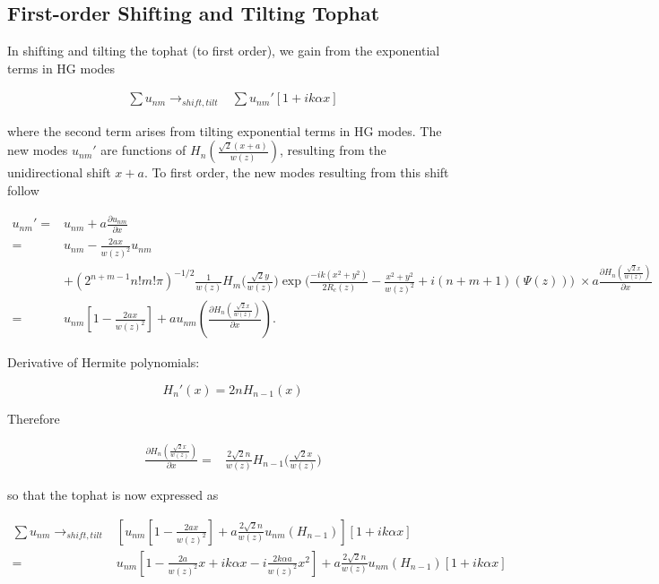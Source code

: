 \documentclass[aps,twoside,secnumarabic,balancelastpage,amsmath,amssymb,nofootinbib,hyperref=pdftex]{revtex4}
\begin{document}
\clearpage

\subsection{First-order Shifting and Tilting Tophat}

In shifting and tilting the tophat (to first order), we gain from the exponential terms in HG modes

\begin{align*}
\sum u_{nm} \rightarrow_{shift,tilt} &
    \sum u_{nm}' \left[
        1+ i k \alpha x
    \right]
\end{align*}


where the second term arises from tilting exponential terms in HG modes. The new modes $u_{nm}'$ are functions of $H_n(\frac{\sqrt{2}(x+a)}{w(z)})$, resulting from the unidirectional shift $x+a$. To first order, the new modes resulting from this shift follow

\begin{align*}
	u_{nm}' =& u_{nm} + a \frac{\partial u_{nm}}{\partial x}
	\\=&
		u_{nm} 
		-
		\frac{2ax}{w(z)^2} 
		u_{nm}
		\\&+
		(2^{n+m-1}n!m!\pi)^{-1/2}
		\frac{1}{w(z)}
		H_{m} \Big(\frac{\sqrt{2}y}{w(z)} \Big)
		\exp \Big(\frac{-ik(x^{2}+y^{2})}{2R_{c}(z)}-
		\frac{x^{2}+y^{2}}{w(z)^{2}} 
		+i(n+m+1)(\Psi(z))		
		\Big)\;
		\times
		a 		
		\frac{\partial H_n(\frac{\sqrt{2}x }{w(z)})}{\partial x}
			\\=&
		u_{nm}
		[
		1
		-
		\frac{2ax}{w(z)^2}]		
		+
		a 	
		u_{nm}(	
		\frac{\partial H_n(\frac{\sqrt{2}x }{w(z)})}{\partial x}
		)
		.
\end{align*}

Derivative of Hermite polynomials:


\begin{equation*}
	H_n'(x) = 2n H_{n-1} (x)
\end{equation*}

Therefore

\begin{align*}
	\frac{\partial H_n(\frac{\sqrt{2}x }{w(z)})}{\partial x}
	=&
	\frac{2 \sqrt{2} n}{w(z)} H_{n-1}\Big(\frac{\sqrt{2}x}{w(z)}\Big)
\end{align*}

so that the tophat is now expressed as

\begin{align*}
	\sum u_{nm} \rightarrow_{shift,tilt}&
    \left[
    u_{nm} 
    [
		1
		-
		\frac{2ax}{w(z)^2}]	
	+ 
	a \frac{2 \sqrt{2} n}{w(z)} 
	u_{nm}(H_{n-1}) \right]
	\left[
        1+ i k \alpha x
    \right]
    \\=&
     u_{nm}
        \left[
        1 - \frac{2 a }{w(z)^2} x + i k \alpha x - i \frac{2 k \alpha a}{w(z)^2} x^2 
    \right]
    + 
	a \frac{2 \sqrt{2} n}{w(z)} 
	u_{nm}(H_{n-1})
	\left[
        1+ i k \alpha x
    \right]
\end{align*}
\end{document}
